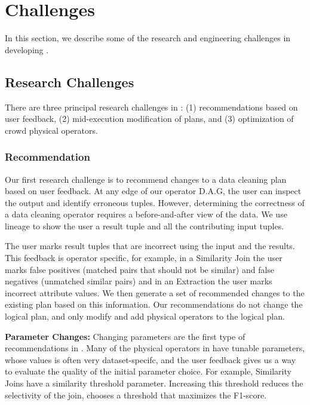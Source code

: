 \section{Challenges}
In this section, we describe some of the research and engineering challenges in developing \sys.

\subsection{Research Challenges}
There are three principal research challenges in \sys: (1) recommendations based on user feedback, (2) mid-execution modification of plans, and (3) 
optimization of crowd physical operators.

\subsubsection{Recommendation}
Our first research challenge is to recommend changes to a data cleaning plan based on user feedback. 
At any edge of our operator D.A.G, the user can inspect the output and identify erroneous tuples.
However, determining the correctness of a data cleaning operator requires a before-and-after view of the data.
We use lineage to show the user a result tuple and all the contributing input tuples.

The user marks result tuples that are incorrect using the input and the results. 
This feedback is operator specific, for example, in a Similarity Join the user marks false positives (matched pairs that should not be similar) and false negatives (unmatched similar pairs) and in an Extraction the user marks incorrect attribute values.
We then generate a set of recommended changes to the existing plan based on this information.
Our recommendations do not change the logical plan, and only modify and add physical operators to the logical plan.

{\noindent \bf Parameter Changes:} Changing parameters are the first type of recommendations in \sys.
Many of the physical operators in \sys have tunable parameters, whose values is often very dataset-specifc, and the user feedback gives us a way to evaluate the quality of the initial parameter choice. 
For example, Similarity Joins have a similarity threshold parameter. 
Increasing this threshold reduces the selectivity of the join, \sys chooses a threshold that maximizes the F1-score. 

\vspace{.5em}

